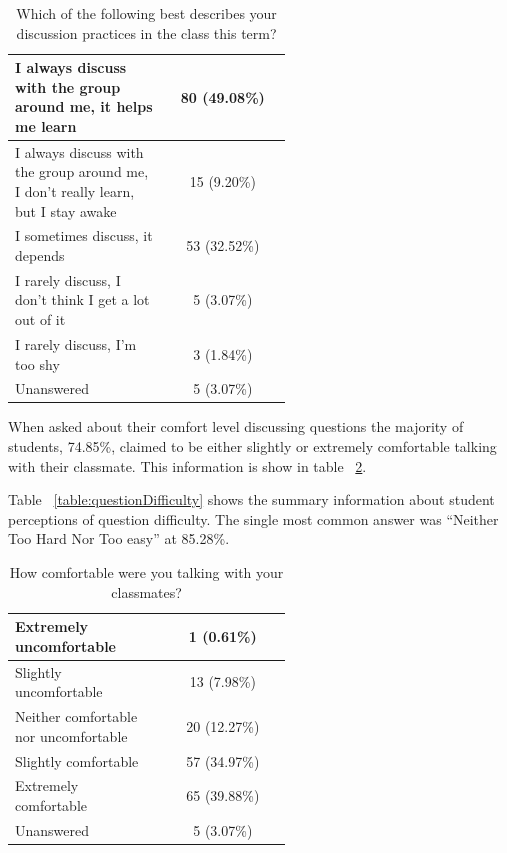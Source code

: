 \documentclass[12pt]{article}
\begin{document}
\begin{table}[ht]
\label{table:groupDiscussion}
\begin{tabular}{p{0.55\linewidth}|c} %
\toprule
 \rowcolor{LightGray}  %
 I always discuss with the group around me, it helps me learn 
 & 80 (49.08\%)\\\midrule 
 I always discuss with the group around me, I don't really learn, but I stay awake 
 & 15 (9.20\%)\\\midrule 
 \rowcolor{LightGray}
 I sometimes discuss, it depends 
 & 53 (32.52\%)\\\midrule 
 I rarely discuss, I don't think I get a lot out of it 
 & 5 (3.07\%)\\\midrule 
 \rowcolor{LightGray}
 I rarely discuss, I'm too shy 
 & 3 (1.84\%)\\\midrule 
 Unanswered 
 & 5 (3.07\%)\\\bottomrule 
\end{tabular}
\caption{Which of the following best describes your discussion practices in the class this term?}
\end{table}

When asked about their comfort level discussing questions the majority of students, 74.85\%, claimed to be either slightly or extremely comfortable talking with their classmate. This information is show in table ~\ref{table:group_comfort}.

Table ~\ref{table:questionDifficulty} shows the summary information about student perceptions of question difficulty. The single most common answer was ``Neither Too Hard Nor Too easy'' at 85.28\%. 


\begin{table}[ht]
\label{table:group_comfort}
\begin{tabular}{p{0.55\linewidth}|c} %
\toprule
 \rowcolor{LightGray} 
 Extremely uncomfortable & 1 (0.61\%)\\\midrule 
 Slightly uncomfortable & 13 (7.98\%)\\\midrule 
 \rowcolor{LightGray}
 Neither comfortable nor uncomfortable & 20 (12.27\%)\\\midrule 
 Slightly comfortable & 57 (34.97\%)\\\midrule 
 \rowcolor{LightGray}
 Extremely comfortable & 65 (39.88\%)\\\midrule 
 Unanswered & 5 (3.07\%)\\\bottomrule 
\end{tabular}
\caption{How comfortable were you talking with your classmates?}
\end{table}
\end{document}
